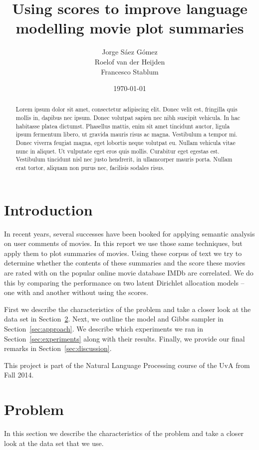 \documentclass[a4paper,10pt]{article}
\title{Using scores to improve language modelling movie plot summaries}
\author{Jorge S\'{a}ez G\'{o}mez\\
Roelof van der Heijden\\
Francesco Stablum
}
\date{\today}
\begin{document}
\maketitle
\begin{abstract}
  Lorem ipsum dolor sit amet, consectetur adipiscing elit. Donec velit est, fringilla quis mollis in, dapibus nec ipsum. Donec volutpat sapien nec nibh suscipit vehicula. In hac habitasse platea dictumst. Phasellus mattis, enim sit amet tincidunt auctor, ligula ipsum fermentum libero, ut gravida mauris risus ac magna. Vestibulum a tempor mi. Donec viverra feugiat magna, eget lobortis neque volutpat eu. Nullam vehicula vitae nunc in aliquet. Ut vulputate eget eros quis mollis. Curabitur eget egestas est. Vestibulum tincidunt nisl nec justo hendrerit, in ullamcorper mauris porta. Nullam erat tortor, aliquam non purus nec, facilisis sodales risus.
\end{abstract}

\section{Introduction} 
In recent years, several successes have been booked for applying semantic analysis on user comments of movies.
In this report we use those same techniques, but apply them to plot summaries of movies.
Using these corpus of text we try to determine whether the contents of these summaries and the score these movies are rated with on the popular online movie database IMDb \cite{IMDb} are correlated.
We do this by comparing the performance on two latent Dirichlet allocation models -- one with and another without using the scores.

First we describe the characteristics of the problem and take a closer look at the data set in Section~\ref{sec:problem}.
Next, we outline the model and Gibbs sampler in Section~\ref{sec:approach}.
We describe which experiments we ran in Section~\ref{sec:experiments} along with their results.
Finally, we provide our final remarks in Section~\ref{sec:discussion}.

This project is part of the Natural Language Processing course of the UvA from Fall 2014.

\section{Problem}
\label{sec:problem}
In this section we describe the characteristics of the problem and take a closer look at the data set that we use.
\end{document}
